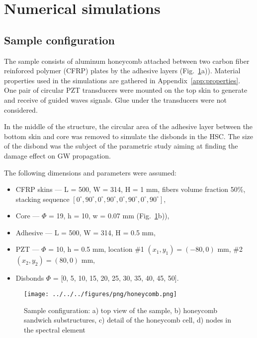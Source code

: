 \documentclass[a4paper,12pt]{article}
\begin{document}
\section{Numerical simulations}
\label{sec:numerical}
\subsection{Sample configuration}
\label{sec:sample}
The sample consists of aluminum honeycomb attached between two carbon fiber 
reinforced polymer (CFRP) plates by the adhesive layers 
(Fig.~\ref{fig:honeycomb}a)).
Material properties used in the simulations are gathered in 
Appendix~\ref{app:properties}. One pair of circular PZT transducers were 
mounted on the top skin to generate and receive of guided waves signals.
Glue under the transducers were not considered.

In the middle of the structure, the circular area of the adhesive layer between 
the bottom skin and core was removed to simulate the disbonds in the HSC.
The size of the disbond was the subject of the parametric study aiming at 
finding the damage effect on GW propagation.

The following dimensions and parameters were assumed:
\begin{itemize}
	\item CFRP skins --- L = 500, W = 314, H = 1 mm, fibers volume fraction 50\%, stacking sequence $[0^\circ,90^\circ,0^\circ,90^\circ,0^\circ,90^\circ,0^\circ,90^\circ]$,
	\item Core --- $\Phi$ = 19, h = 10, w = 0.07 mm (Fig.~\ref{fig:honeycomb}b)),
	\item Adhesive --- L = 500, W = 314, H = 0.5 mm,
	\item PZT --- $\Phi$ = 10, h = 0.5 mm, location \#1 $(x_1,y_1)=(-80,0)$ mm, \#2 $(x_2,y_2)=(80,0)$ mm,
	\item Disbonds $\Phi$ = [0, 5, 10, 15, 20, 25, 30, 35, 40, 45, 50].
\end{itemize}

\begin{figure}
	\begin{center}
		\texttt{[image: ../../../figures/png/honeycomb.png]}
	\end{center}
	\caption{Sample configuration: a) top view of the sample, b) honeycomb sandwich substructures, c) detail of the honeycomb cell, d) nodes in the spectral element}
	\label{fig:honeycomb}
\end{figure}
\end{document}
